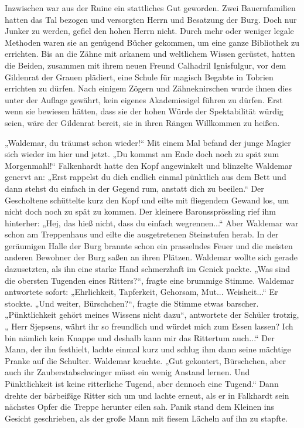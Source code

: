 Inzwischen war aus der Ruine ein stattliches Gut geworden. Zwei Bauernfamilien hatten das Tal bezogen und versorgten Herrn und Besatzung der Burg. Doch nur Junker zu werden, gefiel den hohen Herrn nicht. Durch mehr oder weniger legale Methoden waren sie an genügend Bücher gekommen, um eine ganze Bibliothek zu errichten. Bis an die Zähne mit arkanem und weltlichem Wissen gerüstet, hatten die Beiden, zusammen mit ihrem neuen Freund Calhadril Ignisfulgur, vor dem Gildenrat der Grauen plädiert, eine Schule für magisch Begabte in Tobrien errichten zu dürfen. Nach einigem Zögern und Zähneknirschen wurde ihnen dies unter der Auflage gewährt, kein eigenes Akademiesigel führen zu dürfen. Erst wenn sie bewiesen hätten, dass sie der hohen Würde der Spektabilität würdig seien, wäre der Gildenrat bereit, sie in ihren Rängen Willkommen zu heißen.

„Waldemar, du träumst schon wieder!“ Mit einem Mal befand der junge Magier sich wieder im hier und jetzt. „Du kommst am Ende doch noch zu spät zum Morgenmahl!“ Falkenhardt hatte den Kopf angewinkelt und blinzelte Waldemar genervt an: „Erst rappelst du dich endlich einmal pünktlich aus dem Bett und dann stehst du einfach in der Gegend rum, anstatt dich zu beeilen.“ Der Gescholtene schüttelte kurz den Kopf und eilte mit fliegendem Gewand los, um nicht doch noch zu spät zu kommen. Der kleinere Baronssprössling rief ihm hinterher: „Hej, das hieß nicht, dass du einfach wegrennen...“ Aber Waldemar war schon am Treppenhaus und eilte die ausgetretenen Steinstufen herab. In der geräumigen Halle der Burg brannte schon ein prasselndes Feuer und die meisten anderen Bewohner der Burg saßen an ihren Plätzen. Waldemar wollte sich gerade dazusetzten, als ihn eine starke Hand schmerzhaft im Genick packte. „Was sind die obersten Tugenden eines Ritters?“, fragte eine brummige Stimme. Waldemar antwortete sofort: „Ehrlichkeit, Tapferkeit, Gehorsam, Mut... Weisheit...“ Er stockte. „Und weiter, Bürschchen?“, fragte die Stimme etwas barscher. „Pünktlichkeit gehört meines Wissens nicht dazu“, antwortete der Schüler trotzig, „ Herr Sjepsens, währt ihr so freundlich und würdet mich zum Essen lassen? Ich bin nämlich kein Knappe und deshalb kann mir das Rittertum auch...“ Der Mann, der ihn festhielt, lachte einmal kurz und schlug ihm dann seine mächtige Pranke auf die Schulter. Waldemar keuchte. „Gut gekontert, Bürschchen, aber auch ihr Zauberstabschwinger müsst ein wenig Anstand lernen. Und Pünktlichkeit ist keine ritterliche Tugend, aber dennoch eine Tugend.“ Dann drehte der bärbeißige Ritter sich um und lachte erneut, als er in Falkhardt sein nächstes Opfer die Treppe herunter eilen sah. Panik stand dem Kleinen ins Gesicht geschrieben, als der große Mann mit fiesem Lächeln auf ihn zu stapfte.

